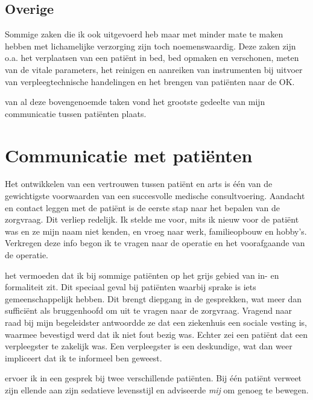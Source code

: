 \documentclass[nohyper,nobib]{tufte-book} %
\begin{document}
\section{Overige}
Sommige zaken die ik ook uitgevoerd heb maar met minder mate te maken hebben met lichamelijke verzorging zijn toch noemenswaardig. Deze zaken zijn o.a. het verplaatsen van een patiënt in bed, bed opmaken en verschonen, meten van de vitale parameters, het reinigen en aanreiken van instrumenten bij uitvoer van verpleegtechnische handelingen en het brengen van patiënten naar de OK.

 van al deze bovengenoemde taken vond het grootste gedeelte van mijn communicatie tussen patiënten plaats. 

\chapter{Communicatie met patiënten}
Het ontwikkelen van een vertrouwen tussen patiënt en arts is één van de gewichtigste voorwaarden van een succesvolle medische consultvoering\cite{veening2009medische}. Aandacht en contact leggen met de patiënt is de eerste stap naar het bepalen van de zorgvraag. Dit verliep redelijk. Ik stelde me voor, mits ik nieuw voor de patiënt was en ze mijn naam niet kenden, en vroeg naar werk, familieopbouw en hobby's. Verkregen deze info begon ik te vragen naar de operatie en het voorafgaande van de operatie.

 het vermoeden dat ik bij sommige patiënten op het grijs gebied van in- en formaliteit zit. Dit speciaal geval bij patiënten waarbij sprake is iets gemeenschappelijk hebben. Dit brengt diepgang in de gesprekken, wat meer dan sufficiënt als bruggenhoofd om uit te vragen naar de zorgvraag.
    Vragend naar raad bij mijn begeleidster antwoordde ze dat een ziekenhuis een sociale vesting is, waarmee bevestigd werd dat ik niet fout bezig was. Echter zei een patiënt dat een verpleegster te zakelijk was. Een verpleegster is een deskundige, wat dan weer impliceert dat ik te informeel ben geweest.

     ervoer ik in een gesprek bij twee verschillende patiënten. Bij één patiënt verweet zijn ellende aan zijn sedatieve levensstijl en adviseerde \textit{mij} om genoeg te bewegen. 
\end{document}
